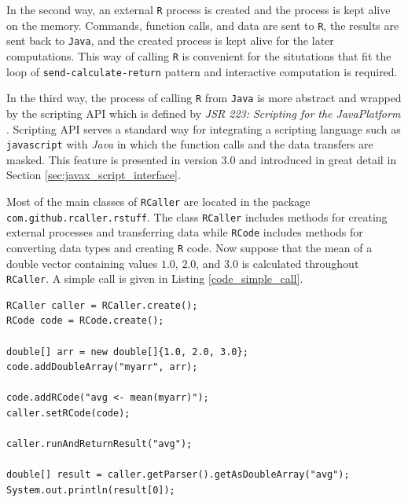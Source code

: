 \documentclass[10pt,a4paper, final, oneside]{article}
\begin{document}
In the second way, an external \texttt{R} process is created and the process is kept alive on the memory. Commands, function calls, and data are sent to \texttt{R}, the results are sent back to \texttt{Java}, and the created process is kept alive for the later computations. This way of calling \texttt{R} is convenient for the situtations that fit the loop of \texttt{send-calculate-return} pattern and interactive computation is required. 

In the third way, the process of calling \texttt{R} from \texttt{Java} is more abstract and wrapped by the scripting API which is defined by \emph{JSR 223: Scripting for the Java\texttrademark Platform} \cite{Friesen2007}. Scripting API serves a standard way for integrating a scripting language such as \texttt{javascript} with \emph{Java} in which the function calls and the data transfers are masked. This feature is presented in version $3.0$ and introduced in great detail in Section \ref{sec:javax_script_interface}.

Most of the main classes of \texttt{RCaller} are located in the package \texttt{com.github.rcaller.rstuff}.
The class \texttt{RCaller} includes methods for creating external processes and transferring data while \texttt{RCode} includes methods for converting data types and creating \texttt{R} code. Now suppose that the mean of a double vector containing values $1.0$, $2.0$, and $3.0$ is calculated throughout \texttt{RCaller}. A simple call is given in Listing \ref{code_simple_call}. 

\begin{minipage}{\linewidth}
\begin{lstlisting}[caption=Simple call,label=code_simple_call]
RCaller caller = RCaller.create();
RCode code = RCode.create();
        
double[] arr = new double[]{1.0, 2.0, 3.0};
code.addDoubleArray("myarr", arr);
        
code.addRCode("avg <- mean(myarr)");
caller.setRCode(code);
        
caller.runAndReturnResult("avg");
        
double[] result = caller.getParser().getAsDoubleArray("avg");
System.out.println(result[0]);
\end{lstlisting}
\end{minipage}
\end{document}
